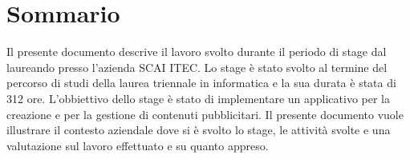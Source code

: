 
\cleardoublepage
{}
{}
\begingroup
\let\clearpage\relax
\let\cleardoublepage\relax
\let\cleardoublepage\relax

\chapter*{Sommario}

Il presente documento descrive il lavoro svolto durante il periodo di stage dal laureando \myName{} presso l'azienda SCAI ITEC.
Lo stage è stato svolto al termine del percorso di studi della laurea triennale in informatica e la sua durata è stata di 312 ore.
L'obbiettivo dello stage è stato di implementare un applicativo per la creazione e per la gestione di contenuti pubblicitari.
Il presente documento vuole illustrare il contesto aziendale dove si è svolto lo stage, le attività svolte e una valutazione sul lavoro effettuato e su quanto appreso.

%
%

\endgroup			

\vfill

